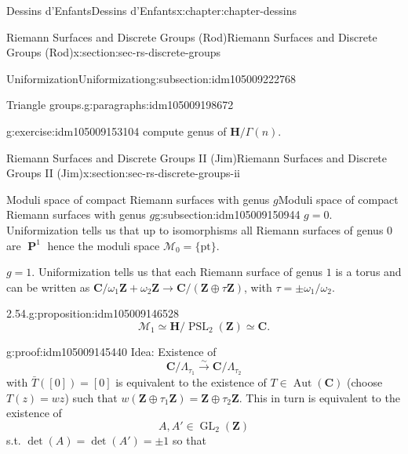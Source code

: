 \documentclass[oneside,10pt,]{book}
\numberwithin{equation}{section}
\newcommand{\lb}{[}
\newcommand{\rb}{]}
\newcommand{\ZZ}{\mathbf{Z}}
\newcommand{\CC}{\mathbf{C}}
\newcommand{\HH}{\mathbf{H}}
\DeclareMathOperator{\PP}{\mathbf{P}}
\DeclareMathOperator{\Aut}{Aut}
\DeclareMathOperator{\GL}{GL}
\DeclareMathOperator{\PSL}{PSL}
\begin{document}
\begin{chapterptx}{Dessins d'Enfants}{}{Dessins d'Enfants}{}{}{x:chapter:chapter-dessins}
\begin{sectionptx}{Riemann Surfaces and Discrete Groups (Rod)}{}{Riemann Surfaces and Discrete Groups (Rod)}{}{}{x:section:sec-rs-discrete-groups}
\begin{subsectionptx}{Uniformization}{}{Uniformization}{}{}{g:subsection:idm105009222768}
\begin{paragraphs}{Triangle groups.}{g:paragraphs:idm105009198672}
\begin{inlineexercise}{}{g:exercise:idm105009153104}
compute genus of \(\HH/\Gamma(n)\).%
\end{inlineexercise}
\end{paragraphs}%
\end{subsectionptx}
\end{sectionptx}
%
%
\typeout{************************************************}
\typeout{************************************************}
%
\begin{sectionptx}{Riemann Surfaces and Discrete Groups II (Jim)}{}{Riemann Surfaces and Discrete Groups II (Jim)}{}{}{x:section:sec-rs-discrete-groups-ii}
%
%
\typeout{************************************************}
\typeout{************************************************}
%
\begin{subsectionptx}{Moduli space of compact Riemann surfaces with genus \(g\)}{}{Moduli space of compact Riemann surfaces with genus \(g\)}{}{}{g:subsection:idm105009150944}
\(g =0\). Uniformization tells us that up to isomorphisms all Riemann surfaces of genus \(0\) are \(\PP^1\) hence the moduli space \(\mathcal M _0  = \{\text{pt}\}\).%
\par
\(g = 1\). Uniformization tells us that each Riemann surface of genus \(1\) is a torus and can be written as \(\CC/ \omega_1\ZZ+ \omega_2\ZZ \to \CC/(\ZZ \oplus \tau \ZZ)\), with \(\tau = \pm \omega_1/\omega_2\).%
\begin{proposition}{2.54.}{}{g:proposition:idm105009146528}%
%
\begin{equation*}
\mathcal M_1 \simeq \HH/ \PSL_2(\ZZ) \simeq \CC\text{.}
\end{equation*}
%
\end{proposition}
\begin{proofptx}{}{g:proof:idm105009145440}
Idea: Existence of%
\begin{equation*}
\CC/ \Lambda_{\tau_1} \xrightarrow{\sim} \CC/\Lambda_{\tau_2}
\end{equation*}
with \(\bar T (\lb 0 \rb) = \lb 0 \rb\) is equivalent to the existence of \(T \in \Aut(\CC)\) (choose \(T(z) = wz\)) such that \(w(\ZZ\oplus \tau_1 \ZZ) = \ZZ\oplus \tau_2\ZZ\). This in turn is equivalent to the existence of%
\begin{equation*}
A,A' \in \GL_2(\ZZ)
\end{equation*}
s.t. \(\det (A) = \det(A') = \pm 1\) so that%
\begin{equation*}

\end{equation*}
\end{proofptx}
\end{subsectionptx}
\end{sectionptx}
\end{chapterptx}
\end{document}
